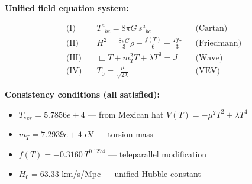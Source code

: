 
\textbf{Unified field equation system:}

\begin{align}
  \text{(I)} \quad & T^a{}_{bc} = 8\pi G \, s^a{}_{bc} && \text{(Cartan)} \\
  \text{(II)} \quad & H^2 = \frac{8\pi G}{3}\rho - \frac{f(T)}{6} + \frac{Tf_T}{3} && \text{(Friedmann)} \\
  \text{(III)} \quad & \Box T + m_T^2 T + \lambda T^3 = J && \text{(Wave)} \\
  \text{(IV)} \quad & T_0 = \frac{\mu}{\sqrt{2\lambda}} && \text{(VEV)}
\end{align}

\textbf{Consistency conditions (all satisfied):}
\begin{itemize}
  \item $T_{\text{vev}} = 5.7856e+4$ — from Mexican hat $V(T) = -\mu^2 T^2 + \lambda T^4$
  \item $m_T = 7.2939e+4$ eV — torsion mass
  \item $f(T) = -0.3160 \, T^{0.1274}$ — teleparallel modification
  \item $H_0 = 63.33$ km/s/Mpc — unified Hubble constant
\end{itemize}